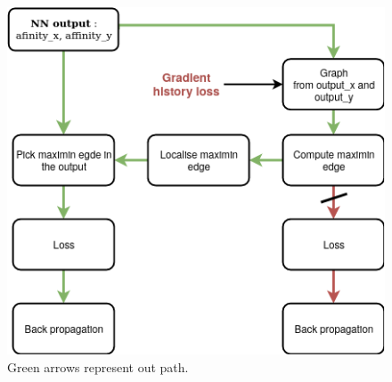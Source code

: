 \begin{figure}[!htbp]
	\centering
	\includegraphics[width=0.6\linewidth]{./images/gradient_history.png}
	\caption{Green arrows represent out path.}
	\label{fig:bpt_method}
\end{figure}


